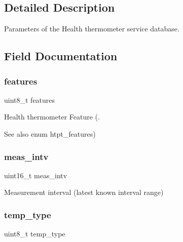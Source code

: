 \subsection{Detailed Description}
Parameters of the Health thermometer service database. 

\subsection{Field Documentation}
\mbox{\label{structat__ble__htpt__db__cfg_aa6b1dd1bb9c0c2e9967e4a7f61644db1}} 
\subsubsection{\texorpdfstring{features}{features}}
{\footnotesize\ttfamily uint8\+\_\+t features}



Health thermometer Feature (. 

\begin{DoxySeeAlso}{See also}
enum htpt\+\_\+features) 
\end{DoxySeeAlso}
\mbox{\label{structat__ble__htpt__db__cfg_aeb599955ad46d909818ed82e07c45181}} 
\subsubsection{\texorpdfstring{meas\_intv}{meas\_intv}}
{\footnotesize\ttfamily uint16\+\_\+t meas\+\_\+intv}



Measurement interval (latest known interval range) 

\mbox{\label{structat__ble__htpt__db__cfg_ae670e214854c4f3876a6895c9dae37ac}} 
\subsubsection{\texorpdfstring{temp\_type}{temp\_type}}
{\footnotesize\ttfamily uint8\+\_\+t temp\+\_\+type}



